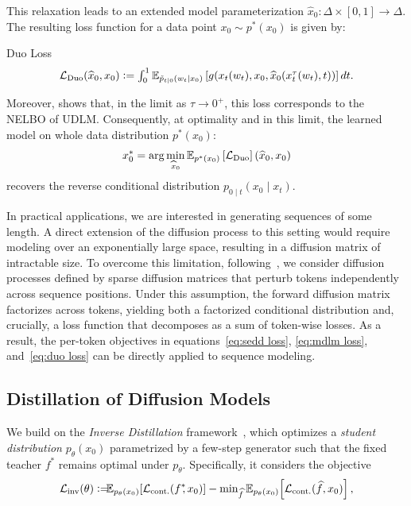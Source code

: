   This relaxation leads to an extended model parameterization $\widehat{x}_0 \colon \Delta \times [0, 1] \to \Delta$. The resulting loss function for a data point $x_0 \sim p^*(x_0)$ is given by:
  \begin{Box1}{Duo Loss}
    \vspace{-8pt}
    \begin{gather}
    \label{eq:duo loss}
      \textstyle \mathcal{L}_{\text{Duo}}(\widehat{x}_0, x_0) \vcentcolon= \int_0^1 \mathbb{E}_{\tilde{p}_{t\mid 0}(w_t\mid x_0)} \left[g(x_t(w_t),x_0, \widehat{x}_0(x_t^{\tau}(w_t), t))\right]dt.
    \end{gather}
  \end{Box1}
  Moreover, \citet{sahoo2025the} shows that, in the limit as $\tau \to 0^{+}$, this loss corresponds to the NELBO of UDLM. Consequently, at optimality and in this limit, the learned model on whole data distribution $p^*(x_0)$:
  \[
    x_0^* = \arg\min_{\widehat{x}_0} \mathbb{E}_{p^*(x_0)}\left[\mathcal{L}_{\text{Duo}}\right](\widehat{x}_0, x_0)
  \]
  recovers the reverse conditional distribution $p_{0\mid t}(x_0 \mid x_t).$
  
  In practical applications, we are interested in generating sequences of some length. A direct extension of the diffusion process to this setting would require modeling over an exponentially large space, resulting in a diffusion matrix of intractable size. To overcome this limitation, following~\citep{lou2024discrete}, we consider diffusion processes defined by sparse diffusion matrices that perturb tokens independently across sequence positions. Under this assumption, the forward diffusion matrix factorizes across tokens, yielding both a factorized conditional distribution and, crucially, a loss function that decomposes as a sum of token-wise losses. As a result, the per-token objectives in equations~\eqref{eq:sedd loss}, \eqref{eq:mdlm loss}, and~\eqref{eq:duo loss} can be directly applied to sequence modeling.

\vspace{-1mm}
\subsection{Distillation of Diffusion Models} 
\vspace{-1mm}
  We build on the \emph{Inverse Distillation} framework~\citep{gushchin2025inverse, kornilov2025universal}, which optimizes a \emph{student distribution} $p_\theta(x_0)$ parametrized by a few-step generator such that the fixed teacher $f^*$ remains optimal under $p_\theta$. Specifically, it considers the objective
  \begin{gather}
   \LC_{\text{inv}}(\theta) \vcentcolon= \!\!\! \EE_{p_{\theta}(x_0)} \!\left[\LC_{\text{cont.}}(f^*\!\!, x_0)\right]  - \min\nolimits_{\widehat{f}} \EE_{p_{\theta}(x_0)} \! \left[\LC_{\text{cont.}}(\widehat{f}, x_0)\right],
  \label{eq:inverse optimization problem}
    \vspace{-1mm}
  \end{gather}

